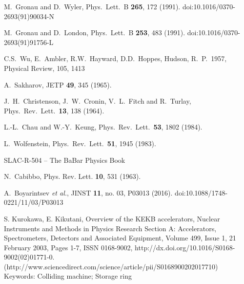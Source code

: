   M.~Gronau and D.~Wyler,
  Phys.\ Lett.\ B {\bf 265}, 172 (1991).
  doi:10.1016/0370-2693(91)90034-N
  
  M.~Gronau and D.~London,
  Phys.\ Lett.\ B {\bf 253}, 483 (1991).
  doi:10.1016/0370-2693(91)91756-L
  
  C.S.~Wu, E.~Ambler, R.W.~Hayward, D.D.~Hoppes, Hudson, R.~P.\ 1957, Physical Review, 105, 1413
  
A.~Sakharov, JETP {\bf 49}, 345 (1965).

  J.~H.~Christenson, J.~W.~Cronin, V.~L.~Fitch and R.~Turlay,
  Phys.\ Rev.\ Lett.\  {\bf 13}, 138 (1964).
  
  L.-L.~Chau and W.-Y.~Keung, 
  Phys.\ Rev.\ Lett.\  {\bf 53}, 1802 (1984).

  L.~Wolfenstein,
  Phys.\ Rev.\ Lett.\  {\bf 51}, 1945 (1983).
  
  SLAC-R-504 -- The BaBar Physics Book
 
N.~Cabibbo, Phys. Rev. Lett. {\bf10}, 531 (1963).
  
  A.~Boyarintsev {\it et al.},
  JINST {\bf 11}, no. 03, P03013 (2016).
  doi:10.1088/1748-0221/11/03/P03013

S. Kurokawa, E. Kikutani, Overview of the KEKB accelerators, Nuclear Instruments and Methods in Physics Research Section A: Accelerators, Spectrometers, Detectors and Associated Equipment, Volume 499, Issue 1, 21 February 2003, Pages 1-7, ISSN 0168-9002, http://dx.doi.org/10.1016/S0168-9002(02)01771-0.
(http://www.sciencedirect.com/science/article/pii/S0168900202017710)
Keywords: Colliding machine; Storage ring

